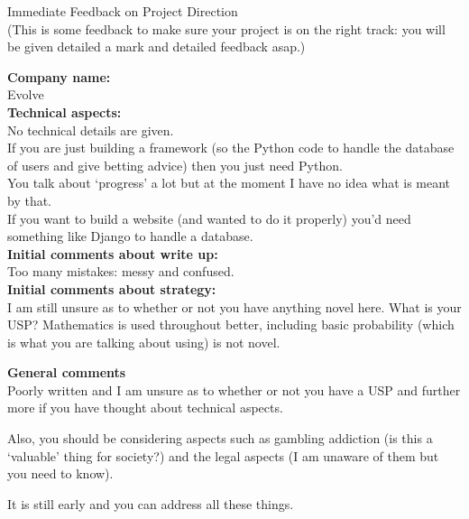 \documentclass{article}
\begin{document}
\begin{center}
\Huge{Immediate Feedback on Project Direction}\\
\tiny{(This is some feedback to make sure your project is on the right track: you will be given detailed a mark and detailed feedback asap.)}
\end{center}


\normalsize
\textbf{Company name:}\\

Evolve \\

\textbf{Technical aspects:}\\

No technical details are given.\\

If you are just building a framework (so the Python code to handle the database of users and give betting advice) then you just need Python.\\

You talk about `progress' a lot but at the moment I have no idea what is meant by that.\\

If you want to build a website (and wanted to do it properly) you'd need something like Django to handle a database.\\

\textbf{Initial comments about write up:}\\

Too many mistakes: messy and confused.\\

\textbf{Initial comments about strategy:}\\

I am still unsure as to whether or not you have anything novel here.
What is your USP?
Mathematics is used throughout better, including basic probability (which is what you are talking about using) is not novel.

\textbf{General comments}\\

Poorly written and I am unsure as to whether or not you have a USP and further more if you have thought about technical aspects.

Also, you should be considering aspects such as gambling addiction (is this a `valuable' thing for society?) and the legal aspects (I am unaware of them but you need to know).

It is still early and you can address all these things.
\end{document}
